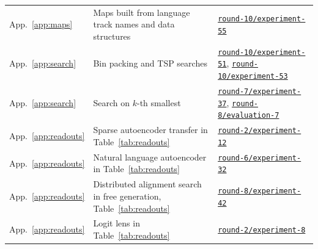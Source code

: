 \documentclass[11pt,letterpaper]{article}
\begin{document}
{\begin{longtable}{@{}L{2.1cm}L{8.9cm}L{4.6cm}@{}}
App.~\ref{app:maps} & Maps built from language track names and data structures & \href{https://github.com/ai-inventor-papers/ai-invention-295f8e-prompt-bans-substitute-not-just-subtract/tree/fork/run_jSassd-YWLVC/round-10/experiment-55}{\texttt{round-10/experiment-55}} \\
App.~\ref{app:search} & Bin packing and TSP searches & \href{https://github.com/ai-inventor-papers/ai-invention-295f8e-prompt-bans-substitute-not-just-subtract/tree/fork/run_jSassd-YWLVC/round-10/experiment-51}{\texttt{round-10/experiment-51}}, \href{https://github.com/ai-inventor-papers/ai-invention-295f8e-prompt-bans-substitute-not-just-subtract/tree/fork/run_jSassd-YWLVC/round-10/experiment-53}{\texttt{round-10/experiment-53}} \\
App.~\ref{app:search} & Search on $k$-th smallest & \href{https://github.com/ai-inventor-papers/ai-invention-295f8e-prompt-bans-substitute-not-just-subtract/tree/fork/run_jSassd-YWLVC/round-7/experiment-37}{\texttt{round-7/experiment-37}}, \href{https://github.com/ai-inventor-papers/ai-invention-295f8e-prompt-bans-substitute-not-just-subtract/tree/fork/run_jSassd-YWLVC/round-8/evaluation-7}{\texttt{round-8/evaluation-7}} \\
App.~\ref{app:readouts} & Sparse autoencoder transfer in Table~\ref{tab:readouts} & \href{https://github.com/ai-inventor-papers/ai-invention-295f8e-prompt-bans-substitute-not-just-subtract/tree/fork/run_jSassd-YWLVC/round-2/experiment-12}{\texttt{round-2/experiment-12}} \\
App.~\ref{app:readouts} & Natural language autoencoder in Table~\ref{tab:readouts} & \href{https://github.com/ai-inventor-papers/ai-invention-295f8e-prompt-bans-substitute-not-just-subtract/tree/fork/run_jSassd-YWLVC/round-6/experiment-32}{\texttt{round-6/experiment-32}} \\
App.~\ref{app:readouts} & Distributed alignment search in free generation, Table~\ref{tab:readouts} & \href{https://github.com/ai-inventor-papers/ai-invention-295f8e-prompt-bans-substitute-not-just-subtract/tree/fork/run_jSassd-YWLVC/round-8/experiment-42}{\texttt{round-8/experiment-42}} \\
App.~\ref{app:readouts} & Logit lens in Table~\ref{tab:readouts} & \href{https://github.com/ai-inventor-papers/ai-invention-295f8e-prompt-bans-substitute-not-just-subtract/tree/fork/run_jSassd-YWLVC/round-2/experiment-8}{\texttt{round-2/experiment-8}} \\
\end{longtable}
}
\end{document}
